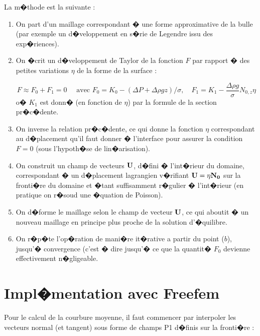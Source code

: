 \documentclass{jfm}
\begin{document}
La m�thode est la suivante :



\begin{enumerate}

\item On part d'un maillage correspondant � une forme approximative de la bulle (par exemple un d�veloppement en s�rie de Legendre issu des exp�riences).

\item On �crit un d�veloppement de Taylor de la fonction $F$ par rapport � des petites variations $\eta$
de la forme de la surface :

$$ 
F \approx F_0 + F_1 = 0 \quad  \mbox{ avec } 
F_0 = K_0 - (\Delta P + \Delta \rho g z)/ \sigma , 
\quad  
F_1 = K_1 - \frac{\Delta \rho g}{\sigma} N_{0,z} \eta
$$ 
o� $K_1$ est donn� (en fonction de $\eta$) par la formule de la section pr�c�dente.

\item On inverse la relation pr�c�dente, ce qui donne la fonction $\eta$ correspondant au d�placement
qu'il faut donner � l'interface pour assurer la condition $F=0$ (sous l'hypoth�se de lin�arisation).

\item On construit un champ de vecteurs $\bf U$, d�fini � l'int�rieur du domaine, correspondant � un d�placement lagrangien v�rifiant ${\bf U} = \eta {\bf N_0}$ sur la fronti�re du domaine et �tant suffisamment r�gulier � l'int�rieur (en pratique on r�soud une �quation de Poisson).

\item On d�forme le maillage selon le champ de vecteur $\bf U$, ce qui aboutit � un nouveau maillage en principe plus proche de la solution d'�quilibre.

\item On r�p�te l'op�ration de mani�re it�rative a partir du point ($b$), jusqu'� convergence
(c'est � dire jusqu'� ce que la quantit� $F_0$ devienne effectivement n�gligeable.


\end{enumerate}






\section{Impl�mentation avec Freefem}

Pour le calcul de la courbure moyenne, il faut commencer par interpoler les vecteurs normal (et tangent) 
sous forme de champs P1 d�finis sur la fronti�re :
\end{document}
